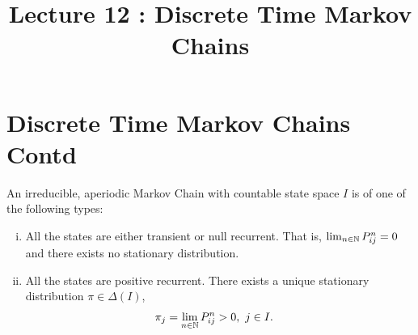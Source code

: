\documentclass[a4paper,10pt,english]{article}
\title{Lecture 12 : Discrete Time Markov Chains}
\author{}
\begin{document}
\maketitle
\section{Discrete Time Markov Chains Contd}
\begin{thm}
An irreducible, aperiodic Markov Chain with countable state space $I$ is of one of the following types:
\begin{enumerate}[i)]
\item All the states are either transient or null recurrent. That is, $\lim_{n \in \mathbb{N}}P_{ij}^n = 0$  and there exists no stationary distribution.
\item All the states are positive recurrent. There exists a unique stationary distribution $\pi \in \Delta(I)$,
\begin{align*}
 \pi_j &= \lim_{n \in \mathbb{N}} P^n_{ij} > 0,~ j \in I.
 \end{align*}
\end{enumerate}
\end{thm}
\end{document}
